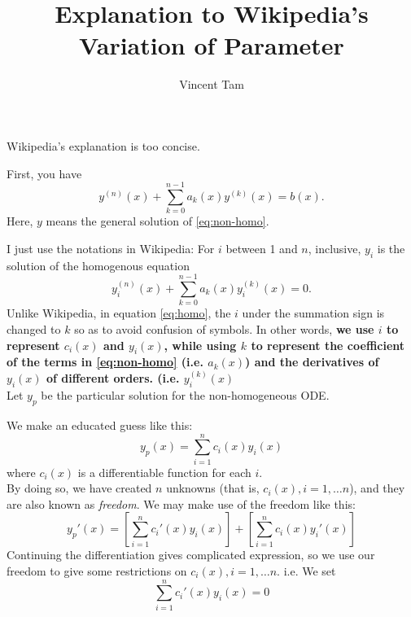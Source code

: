 \documentclass[a4paper,12pt]{article}
\author{Vincent Tam}
\title{Explanation to Wikipedia's Variation of Parameter}
\begin{document}
\maketitle
Wikipedia's explanation is too concise. \cite{wiki13}

First, you have
\begin{equation}
  y^{(n)}(x)+\sum_{k=0}^{n-1} a_k(x)y^{(k)}(x)=b(x).
  \label{eq:non-homo}
\end{equation}
Here, $y$ means the general solution of \eqref{eq:non-homo}.

I just use the notations in Wikipedia: For $i$ between 1 and $n$,
inclusive, $y_i$ is the solution of the homogenous equation
\begin{equation}
  y_i^{(n)}(x)+\sum_{k=0}^{n-1} a_k(x)y_i^{(k)}(x)=0.
  \label{eq:homo}
\end{equation}
Unlike Wikipedia, in equation \eqref{eq:homo}, the $i$ under the
summation sign is changed to $k$ so as to avoid confusion of symbols.
In other words, \textbf{we use $i$ to represent $c_i(x)$ and $y_i(x)$,
while using $k$ to represent the coefficient of the terms in
\eqref{eq:non-homo} (i.e. $a_k(x)$) and the derivatives of $y_i(x)$ of
different orders. (i.e. $y_i^{(k)}(x)$}\\
Let $y_p$ be the particular solution for the non-homogeneous ODE.

We make an educated guess like this:
\begin{equation}
  \boxed{y_p(x)=\sum_{i=1}^{n} c_i(x) y_i(x)}
  \label{eq:part-def}
\end{equation}
where $c_i(x)$ is a differentiable function for each $i$.\\
By doing so, we have created $n$ unknowns (that is, $c_i(x),i=1,\dots
n$), and they are also known as \emph{freedom}. We may make use of the
freedom like this:
\begin{equation}
  y_p'(x)=\left[ \sum_{i=1}^{n} c_i'(x) y_i(x) \right]+\left[
  \sum_{i=1}^{n} c_i(x) y_i'(x) \right]
  \label{eq:part-d1}
\end{equation}
Continuing the differentiation gives complicated expression, so we use
our freedom to give some restrictions on $c_i(x),i=1,\dots n$. i.e. We
set
\begin{equation}
  \boxed{\sum_{i=1}^{n} c_i'(x) y_i(x)=0}
  \label{eq:part-d1-restr}
\end{equation}
\end{document}
